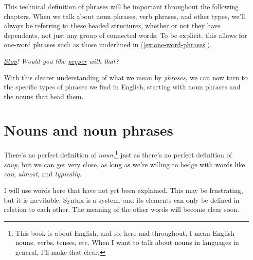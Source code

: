 This technical definition of phrases will be important throughout the following chapters. When we talk about noun phrases, verb phrases, and other types, we'll always be referring to these headed structures, whether or not they have dependents, not just any group of connected words. To be explicit, this allows for one-word phrases such as those underlined in (\ref{ex:one-word-phrases}).

\ea \label{ex:one-word-phrases}
    \ea \textit{\uline{Stop}!}
    \ex \textit{Would you like \uline{pepper} with that?}
\z\z

With this clearer understanding of what we mean by \textit{phrases}, we can now turn to the specific types of phrases we find in English, starting with noun phrases and the nouns that head them.

\section{Nouns and noun phrases}\label{sec:nouns}



There's no perfect definition of \textit{noun},\footnote{This book is about English, and so, here and throughout, I mean English nouns, verbs, tenses, etc. When I want to talk about nouns in languages in general, I'll make that clear.} just as there's no perfect definition of \textit{soup}, but we can get very close, as long as we're willing to hedge with words like \textit{can}, \textit{almost}, and \textit{typically}.

I will use words here that have not yet been explained. This may be frustrating, but it is inevitable. Syntax is a system, and its elements can only be defined in relation to each other. The meaning of the other words will become clear soon.

